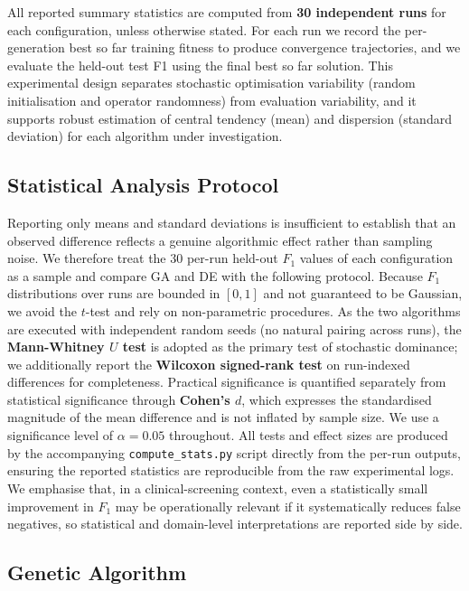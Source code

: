 \documentclass[12pt, a4paper]{article}
\begin{document}
All reported summary statistics are computed from \textbf{30 independent runs} for each configuration, unless otherwise stated. For each run we record the per-generation best so far training fitness to produce convergence trajectories, and we evaluate the held-out test F1 using the final best so far solution. This experimental design separates stochastic optimisation variability (random initialisation and operator randomness) from evaluation variability, and it supports robust estimation of central tendency (mean) and dispersion (standard deviation) for each algorithm under investigation.

\subsection{Statistical Analysis Protocol}\label{sec:stats}
Reporting only means and standard deviations is insufficient to establish that an observed difference reflects a genuine algorithmic effect rather than sampling noise. We therefore treat the $30$ per-run held-out $F_1$ values of each configuration as a sample and compare GA and DE with the following protocol. Because $F_1$ distributions over runs are bounded in $[0,1]$ and not guaranteed to be Gaussian, we avoid the $t$-test and rely on non-parametric procedures. As the two algorithms are executed with independent random seeds (no natural pairing across runs), the \textbf{Mann-Whitney $U$ test} is adopted as the primary test of stochastic dominance; we additionally report the \textbf{Wilcoxon signed-rank test} on run-indexed differences for completeness. Practical significance is quantified separately from statistical significance through \textbf{Cohen's $d$}, which expresses the standardised magnitude of the mean difference and is not inflated by sample size. We use a significance level of $\alpha=0.05$ throughout. All tests and effect sizes are produced by the accompanying \texttt{compute\_stats.py} script directly from the per-run outputs, ensuring the reported statistics are reproducible from the raw experimental logs. We emphasise that, in a clinical-screening context, even a statistically small improvement in $F_1$ may be operationally relevant if it systematically reduces false negatives, so statistical and domain-level interpretations are reported side by side.

\subsection{Genetic Algorithm}
\end{document}

